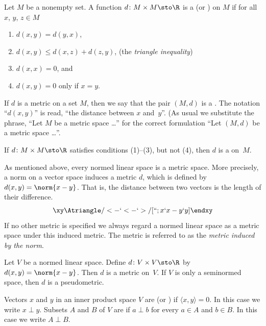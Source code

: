 \begin{defn}\label{C019614} Let $M$ be a nonempty set. A function $d \colon M \times M \sto \R$ is a
 (or
) on $M$ if for all $x$, $y$, $z \in M$
 \begin{enumerate}
     \item $d(x,y) = d(y,x)$,
     \item $d(x,y) \le d(x,z) + d(z,y)$, \qquad (the
\emph{triangle inequality})
     \item $d(x,x) = 0$, and
     \item $d(x,y) = 0$ only if $x = y$.
 \end{enumerate}
If $d$ is a metric on a set $M$, then we say that the pair $(M,d)$ is a
.  The notation ``$d(x,y)$'' is read, ``the distance between $x$
and~$y$''. (As usual we substitute the phrase, ``Let $M$ be a metric space \dots '' for
the correct formulation ``Let $(M,d)$ be a metric space \dots''.

If $d \colon M \times M \sto \R$ satisfies conditions (1)--(3), but not (4), then $d$ is a
 on~$M$.
\end{defn}

As mentioned above, every normed linear space is a metric space. More precisely, a norm on a vector space
induces a
metric $d$, which is defined by $d(x,y) = \norm{x - y}$.  That is, the distance between
two vectors is the length of their difference.
  \[ \xy
       \Atriangle/<-`<-`>/[``;x`x-y`y]
  \endxy \]
If no other metric is specified we always regard a normed linear space as a metric space
under this induced metric.  The metric is referred to as the \emph{metric induced by the norm}.

\begin{exam}\label{0001503}  Let $V$ be a normed linear space.  Define
$d\colon V \times V \sto \R$ by $d(x,y) = \norm{x - y}$.  Then $d$ is a metric on~$V$.
If $V$ is only a seminormed space, then $d$ is a pseudometric.
\end{exam}

\begin{defn} Vectors $x$ and $y$ in an inner product space $V$ are
 (or
) if $\langle x,y \rangle = 0$.  In this case we write
$x \perp y$.  Subsets $A$ and $B$ of $V$ are  if $a \perp b$ for every $a
\in A$ and $b \in B$.  In this case we write $A \perp B$.
\end{defn}


